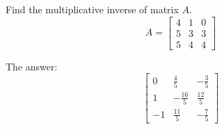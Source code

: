 
\begin{question}
Find the multiplicative inverse of matrix \(A\).
\[A = \left[\begin{matrix}4 & 1 & 0\\5 & 3 & 3\\5 & 4 & 4\end{matrix}\right]\]
\end{question}

\begin{solution}
The answer:
\[\left[\begin{matrix}0 & \frac{4}{5} & - \frac{3}{5}\\1 & - \frac{16}{5} & \frac{12}{5}\\-1 & \frac{11}{5} & - \frac{7}{5}\end{matrix}\right]\]
\end{solution}

